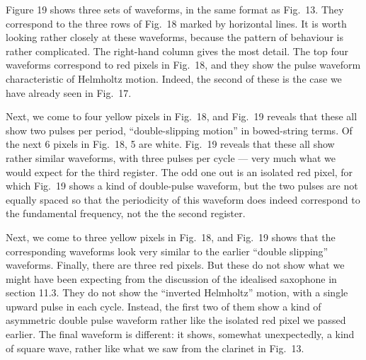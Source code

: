 
  Figure 19 shows three sets of waveforms, in the same format as Fig.\ 13. They 
  correspond to the three rows of Fig.\ 18 marked by horizontal lines. It is 
  worth looking rather closely at these waveforms, because the pattern of 
  behaviour is rather complicated. The right-hand column gives the most detail. 
  The top four waveforms correspond to red pixels in Fig.\ 18, and they show 
  the pulse waveform characteristic of Helmholtz motion. Indeed, the second of 
  these is the case we have already seen in Fig.\ 17. 


  Next, we come to four yellow pixels in Fig.\ 18, and Fig.\ 19 reveals that 
  these all show two pulses per period, “double-slipping motion” in 
  bowed-string terms. Of the next 6 pixels in Fig.\ 18, 5 are white. Fig.\ 19 
  reveals that these all show rather similar waveforms, with three pulses per 
  cycle — very much what we would expect for the third register. The odd one 
  out is an isolated red pixel, for which Fig.\ 19 shows a kind of double-pulse 
  waveform, but the two pulses are not equally spaced so that the periodicity 
  of this waveform does indeed correspond to the fundamental frequency, not the 
  the second register. 

  Next, we come to three yellow pixels in Fig.\ 18, and Fig.\ 19 shows that the 
  corresponding waveforms look very similar to the earlier “double slipping” 
  waveforms. Finally, there are three red pixels. But these do not show what we 
  might have been expecting from the discussion of the idealised saxophone in 
  section 11.3. They do not show the “inverted Helmholtz” motion, with a single 
  upward pulse in each cycle. Instead, the first two of them show a kind of 
  asymmetric double pulse waveform rather like the isolated red pixel we passed 
  earlier. The final waveform is different: it shows, somewhat unexpectedly, a 
  kind of square wave, rather like what we saw from the clarinet in Fig.\ 13. 

